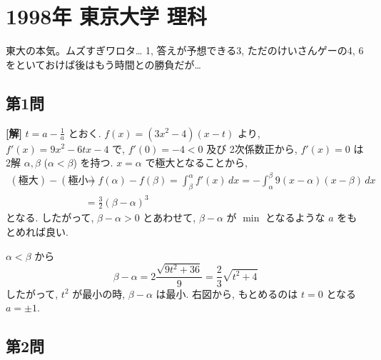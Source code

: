 \documentclass[../main.tex]{subfiles}
\begin{document}
\section*{1998年 東京大学 理科}

\noindent
東大の本気。ムズすぎワロタ\dots{} 1, 答えが予想できる3, ただのけいさんゲーの4, 6をといておけば後はもう時間との勝負だが\dots

\newpage

\subsection*{第1問}

\noindent
\textbf{[解]} $t = a - \frac{1}{a}$ とおく. $f(x) = (3x^2 - 4)(x - t)$ より, $f'(x) = 9x^2 - 6tx - 4$ で, $f'(0) = -4 < 0$ 及び 2次係数正から, $f'(x) = 0$ は 2解 $\alpha, \beta$ ($\alpha < \beta$) を持つ. $x = \alpha$ で極大となることから,
\begin{align*}
  (\text{極大}) - (\text{極小}) &= f(\alpha) - f(\beta) = \int_{\beta}^{\alpha} f'(x) \, dx = -\int_{\alpha}^{\beta} 9(x - \alpha)(x - \beta) \, dx \\
  &= \frac{3}{2}(\beta - \alpha)^3
\end{align*}
となる. したがって, $\beta - \alpha > 0$ とあわせて, $\beta - \alpha$ が $\min$ となるような $a$ をもとめれば良い.

$\alpha < \beta$ から
\[
  \beta - \alpha = 2 \frac{\sqrt{9t^2 + 36}}{9} = \frac{2}{3} \sqrt{t^2 + 4}
\]
したがって, $t^2$ が最小の時, $\beta - \alpha$ は最小. 右図から, もとめるのは $t = 0$ となる $a = \pm 1$.

\begin{center}
\end{center}

\newpage

\subsection*{第2問}
\end{document}
